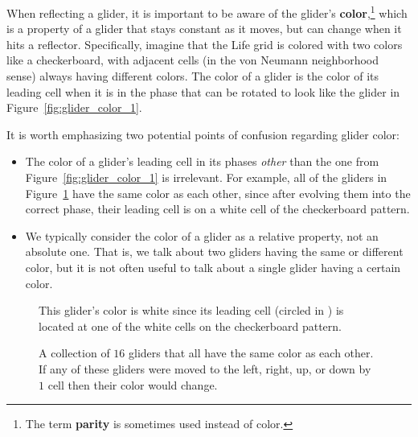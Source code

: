 When reflecting a glider, it is important to be aware of the glider's \textbf{color},\footnote{The term \textbf{parity} is sometimes used instead of color.} which is a property of a glider that stays constant as it moves, but can change when it hits a reflector. Specifically, imagine that the Life grid is colored with two colors like a checkerboard, with adjacent cells (in the von Neumann neighborhood sense) always having different colors. The color of a glider is the color of its leading cell when it is in the phase that can be rotated to look like the glider in Figure~\ref{fig:glider_color_1}.

It is worth emphasizing two potential points of confusion regarding glider color:\medskip

\begin{itemize}
	\item The color of a glider's leading cell in its phases \emph{other} than the one from Figure~\ref{fig:glider_color_1} is irrelevant. For example, all of the gliders in Figure~\ref{fig:glider_color} have the same color as each other, since after evolving them into the correct phase, their leading cell is on a white cell of the checkerboard pattern.\smallskip
	
	\item We typically consider the color of a glider as a relative property, not an absolute one. That is, we talk about two gliders having the same or different color, but it is not often useful to talk about a single glider having a certain color.\medskip
\end{itemize}

\begin{figure}[!htb]
	\centering
	\begin{minipage}[b]{.3\textwidth}
		\centering{}
		\caption{This glider's color is white since its leading cell (circled in ) is located at one of the white cells on the checkerboard pattern.}\label{fig:glider_color_1}
	\end{minipage} \hfill %
	\begin{minipage}[b]{.66\textwidth}
		\centering
		\caption{A collection of $16$ gliders that all have the same color as each other. If any of these gliders were moved to the left, right, up, or down by $1$ cell then their color would change.}\label{fig:glider_color}
	\end{minipage}
\end{figure}

